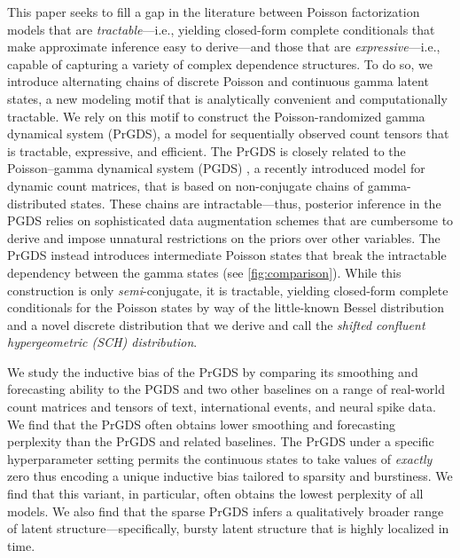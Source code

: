 \documentclass{article}
\begin{document}
This paper seeks to fill a gap in the literature between Poisson factorization models that are \emph{tractable}---i.e., yielding closed-form complete conditionals that make approximate inference easy to derive---and those that are \emph{expressive}---i.e., capable of capturing a variety of complex dependence structures. To do so, we introduce alternating chains of discrete Poisson and continuous gamma latent states, a new modeling motif that is analytically convenient and computationally tractable. We rely on this motif to construct the Poisson-randomized gamma dynamical system (PrGDS), a model for sequentially observed count tensors that is tractable, expressive, and efficient. The PrGDS is closely related to the Poisson--gamma dynamical system (PGDS) \cite{schein2016poisson}, a recently introduced model for dynamic count matrices, that is based on non-conjugate chains of gamma-distributed states. These chains are intractable---thus, posterior inference in the PGDS relies on sophisticated data augmentation schemes that are cumbersome to derive and impose unnatural restrictions on the priors over other variables. The PrGDS instead introduces intermediate Poisson states that break the intractable dependency between the gamma states (see \cref{fig:comparison}). While this construction is only \emph{semi}-conjugate, it is tractable, yielding closed-form complete conditionals for the Poisson states by way of the little-known Bessel distribution~\cite{yuan2000bessel} and a novel discrete distribution that we derive and call the \emph{shifted confluent hypergeometric (SCH) distribution}.~

We study the inductive bias of the PrGDS by comparing its smoothing and forecasting ability to the PGDS and two other baselines on a range of real-world count matrices and tensors of text, international events, and neural spike data. We find that the PrGDS often obtains lower smoothing and forecasting perplexity than the PrGDS and related baselines. The PrGDS under a specific hyperparameter setting permits the continuous states to take values of \emph{exactly} zero thus encoding a unique inductive bias tailored to sparsity and burstiness. We find that this variant, in particular, often obtains the lowest perplexity of all models. We also find that the sparse PrGDS infers a qualitatively broader range of latent structure---specifically, bursty latent structure that is highly localized in time.~
\end{document}
